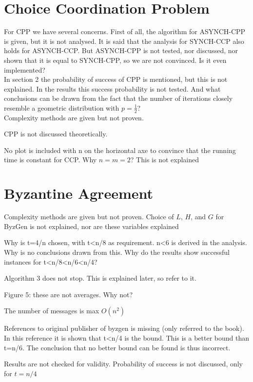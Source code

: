 \documentclass[nocopyrightspace]{acm_proc_article-sp}
\begin{document}
\section{Choice Coordination Problem}
For CPP we have several concerns. First of all, the algorithm for ASYNCH-CPP is given, but it is not analysed. It is said that the analysis for SYNCH-CCP also holds for ASYNCH-CCP. But ASYNCH-CPP is not tested, nor discussed, nor shown that it is equal to SYNCH-CPP, so we are not convinced. Is it even implemented? \\
In section 2 the probability of success of CPP is mentioned, but this is not explained. In the results this success probability is not tested. And what conclusions can be drawn from the fact that the number of iterations closely resemble a geometric distribution with $p=\frac{1}{2}$? \\


Complexity methods are given but not proven.



CPP is not discussed theoretically. 

No plot is included with n on the horizontal axe to convince that the running time is constant for CCP. Why $n=m=2$? This is not explained

\section{Byzantine Agreement}
Complexity methods are given but not proven.
Choice of $L$, $H$, and $G$ for ByzGen is not explained, nor are these variables explained

Why is t=4/n chosen, with t<n/8 as requirement. n<6 is derived in the analysis. Why is no conclusions drawn from this.
Why do the results show successful instances for t<n/8<n/6<n/4?

Algorithm 3 does not stop. This is explained later, so refer to it.

Figure 5: these are not averages. Why not?

The number of messages is max $O(n^2)$

References to original publisher of byzgen is missing (only referred to the book).
In this reference it is shown that t<n/4 is the bound. This is a better bound than t=n/6. The conclusion that no better bound can be found is thus incorrect.

Results are not checked for validity. Probability of success is not discussed, only for $t=n/4$
\end{document}
